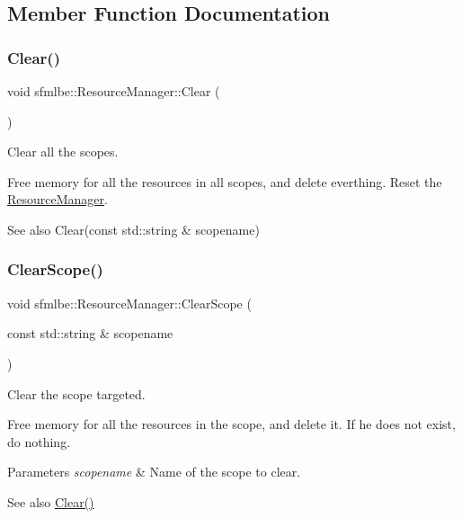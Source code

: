 \subsection{Member Function Documentation}
\mbox{\label{classsfmlbe_1_1_resource_manager_ae7496b805297eef8c8315ab2437c008c}} 
\subsubsection{\texorpdfstring{Clear()}{Clear()}}
{\footnotesize\ttfamily void sfmlbe\+::\+Resource\+Manager\+::\+Clear (\begin{DoxyParamCaption}{ }\end{DoxyParamCaption})}



Clear all the scopes. 

Free memory for all the resources in all scopes, and delete everthing. Reset the \mbox{\hyperlink{classsfmlbe_1_1_resource_manager}{Resource\+Manager}}. \begin{DoxySeeAlso}{See also}
Clear(const std\+::string \& scopename) 
\end{DoxySeeAlso}
\mbox{\label{classsfmlbe_1_1_resource_manager_a2d25aeeab0779847e3c010ab89c50d0f}} 
\subsubsection{\texorpdfstring{Clear\+Scope()}{ClearScope()}}
{\footnotesize\ttfamily void sfmlbe\+::\+Resource\+Manager\+::\+Clear\+Scope (\begin{DoxyParamCaption}\item[{const std\+::string \&}]{scopename }\end{DoxyParamCaption})}



Clear the scope targeted. 

Free memory for all the resources in the scope, and delete it. If he does not exist, do nothing. 
\begin{DoxyParams}{Parameters}
{\em scopename} & Name of the scope to clear. \\
\hline
\end{DoxyParams}
\begin{DoxySeeAlso}{See also}
\mbox{\hyperlink{classsfmlbe_1_1_resource_manager_ae7496b805297eef8c8315ab2437c008c}{Clear()}} 
\end{DoxySeeAlso}
\mbox{\label{classsfmlbe_1_1_resource_manager_aea559b11d248db65d6bff0caf902098a}} 
